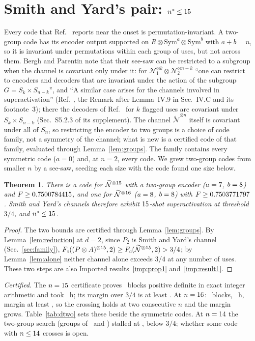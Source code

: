 \documentclass[aps,pra,twocolumn,superscriptaddress,nofootinbib,longbibliography,floatfix]{revtex4-2}
\newtheorem{theorem}{Theorem}
\newcommand{\nt}{\widetilde{\mathcal N}}
\newcommand{\sym}{\mathrm{Sym}}
\begin{document}
\section{Smith and Yard's pair: $n^*\le15$}
\label{sec:dtwo}

Every code that Ref.~\cite{parentin2026onset} reports near the onset is permutation-invariant. A two-group code has its encoder output supported on $R\otimes\sym^a\otimes\sym^b$ with $a+b=n$, so it is invariant under permutations within each group of uses, but not across them. Bergh and Parentin note that their see-saw can be restricted to a subgroup when the channel is covariant only under it: for $\mathcal N_1^{\otimes k}\otimes\mathcal N_2^{\otimes n-k}$ ``one can restrict to encoders and decoders that are invariant under the action of the subgroup $G=S_k\times S_{n-k}$'', and ``A similar case arises for the channels involved in superactivation'' (Ref.~\cite{bergh2026permutation}, the Remark after Lemma~IV.9 in Sec.~IV.C and its footnote~3); there the decoders of Ref.~\cite{parentin2026onset} for $k$ flagged uses are covariant under $S_k\times S_{n-k}$ (Sec.~S5.2.3 of its supplement). The channel $\nt^{\otimes n}$ itself is covariant under all of $S_n$, so restricting the encoder to two groups is a choice of code family, not a symmetry of the channel; what is new is a certified code of that family, evaluated through Lemma~\ref{lem:groups}. The family contains every symmetric code ($a=0$) and, at $n=2$, every code. We grew two-group codes from smaller $n$ by a see-saw, seeding each size with the code found one size below.

\begin{theorem}
\label{thm:dtwo}
There is a code for $\nt^{\otimes\TgFifteenN}$ with a two-group encoder ($a=7$, $b=8$) and $F\ge0.7500784415$, and one for $\nt^{\otimes\TgSixteenN}$ ($a=8$, $b=8$) with $F\ge0.7503771797$. Smith and Yard's channels therefore exhibit $15$-shot superactivation at threshold $3/4$, and $n^*\le15$.
\end{theorem}
\begin{proof}
The two bounds are certified through Lemma~\ref{lem:groups}. By Lemma~\ref{lem:reduction} at $d=2$, since $P_2$ is Smith and Yard's channel (Sec.~\ref{sec:family}), $F_c((P\otimes A)^{\otimes\TgFifteenN},2)\ge F_c(\nt^{\otimes\TgFifteenN},2)>3/4$; by Lemma~\ref{lem:alone} neither channel alone exceeds $3/4$ at any number of uses. These two steps are also Imported results~\ref{imp:prop1} and~\ref{imp:result1}.
\end{proof}
\noindent\emph{Certified.} The $n=15$ certificate proves \TgFifteenBlocks\ blocks positive definite in exact integer arithmetic and took \TgFifteenHours~h; its margin over $3/4$ is at least \TgFifteenMargin. At $n=16$: \TgSixteenBlocks\ blocks, \TgSixteenHours~h, margin at least \TgSixteenMargin, so the crossing holds at two consecutive $n$ and the margin grows. Table~\ref{tab:dtwo} sets these beside the symmetric codes. At $n=14$ the two-group search (groups of \TgFourteenA\ and \TgFourteenB) stalled at \TgFourteenF, below $3/4$; whether some code with $n\le14$ crosses is open.
\end{document}
